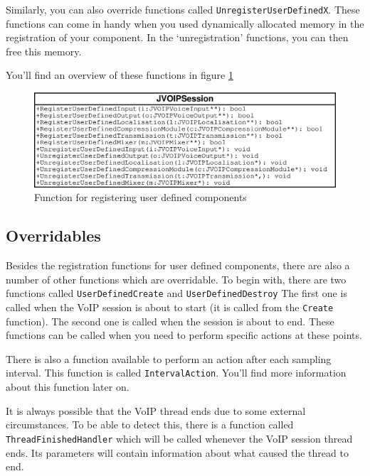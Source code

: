 		Similarly, you can also override functions called
		{\tt UnregisterUserDefinedX}. These functions can come in handy when you used
		dynamically allocated memory in the registration of your component. In the
		`unregistration' functions, you can then free this memory.
		
		You'll find an overview of these functions in figure \ref{register-userdef-functions}
		\begin{figure}
			\center
			\includegraphics[width=\linewidth]{images/manual/chapter2/register-userdef-functions.eps}
			\caption{Function for registering user defined components}
			\label{register-userdef-functions}
		\end{figure}
		
		\subsection{Overridables}\label{subsection-overridables}
		
		Besides the registration functions for user defined components, there are
		also a number of other functions which are overridable. To begin with,
		there are two functions called {\tt UserDefinedCreate} and
		{\tt UserDefinedDestroy} The first one is called when the VoIP session is
		about to start (it is called from the {\tt Create} function). The second one
		is called when the session is about to end. These functions can be called
		when you need to perform specific actions at these points.
		
		There is also a function available to perform an action after each
		sampling interval. This function is called {\tt IntervalAction}. You'll find
		more information about this function later on.
		
		It is always possible that the VoIP thread ends due to some external
		circumstances. To be able to detect this, there is a function called
		{\tt Thread\-Fi\-nished\-Handler} which will be called whenever the VoIP session
		thread ends. Its parameters will contain information about what caused
		the thread to end.
		
